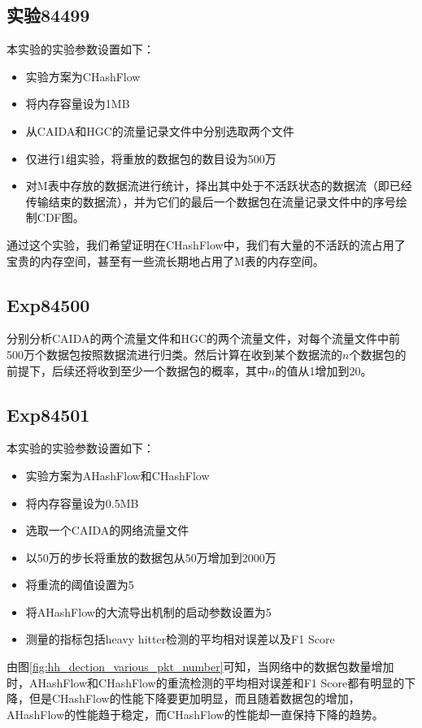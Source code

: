 \documentclass{article}
\begin{document}
\subsection{实验84499}
本实验的实验参数设置如下：
\begin{itemize}
	\item 实验方案为CHashFlow
	\item 将内存容量设为1MB
	\item 从CAIDA和HGC的流量记录文件中分别选取两个文件
	\item 仅进行1组实验，将重放的数据包的数目设为500万
	\item 对M表中存放的数据流进行统计，择出其中处于不活跃状态的数据流（即已经传输结束的数据流），并为它们的最后一个数据包在流量记录文件中的序号绘制CDF图。
\end{itemize}
通过这个实验，我们希望证明在CHashFlow中，我们有大量的不活跃的流占用了宝贵的内存空间，甚至有一些流长期地占用了M表的内存空间。

\subsection{Exp84500}
分别分析CAIDA的两个流量文件和HGC的两个流量文件，对每个流量文件中前500万个数据包按照数据流进行归类。然后计算在收到某个数据流的$n$个数据包的前提下，后续还将收到至少一个数据包的概率，其中$n$的值从1增加到20。

\subsection{Exp84501}
本实验的实验参数设置如下：
\begin{itemize}
	\item 实验方案为AHashFlow和CHashFlow
	\item 将内存容量设为0.5MB
	\item 选取一个CAIDA的网络流量文件
	\item 以50万的步长将重放的数据包从50万增加到2000万
	\item 将重流的阈值设置为5
	\item 将AHashFlow的大流导出机制的启动参数设置为5
	\item 测量的指标包括heavy hitter检测的平均相对误差以及F1 Score
\end{itemize}

由图\ref{fig:hh_dection_various_pkt_number}可知，当网络中的数据包数量增加时，AHashFlow和CHashFlow的重流检测的平均相对误差和F1 Score都有明显的下降，但是CHashFlow的性能下降要更加明显，而且随着数据包的增加，AHashFlow的性能趋于稳定，而CHashFlow的性能却一直保持下降的趋势。
\end{document}
